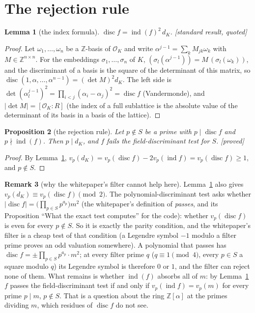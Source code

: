 \documentclass[10pt,a4paper]{article}
\newcommand{\Z}{\mathbb{Z}}
\newcommand{\OK}{\mathcal{O}_K}
\DeclareMathOperator{\disc}{disc}
\DeclareMathOperator{\ind}{ind}
\newcommand{\stproved}{\textsf{\small[proved]}\xspace}
\newcommand{\stquoted}{\textsf{\small[standard result, quoted]}\xspace}
\theoremstyle{plain}
\newtheorem{proposition}{Proposition}
\newtheorem{lemma}[proposition]{Lemma}
\theoremstyle{definition}
\newtheorem{remark}[proposition]{Remark}
\begin{document}
\section{The rejection rule}\label{sec:rule}

\begin{lemma}[the index formula]\label{lem:index}
$\disc f=\ind(f)^2\,d_K$.  \stquoted\ \cite[Ch.~I, Prop.~2.12]{Neu}
\end{lemma}

\begin{proof}
Let $\omega_1,\dots,\omega_n$ be a $\Z$-basis of $\OK$ and write $\alpha^{j-1}=\sum_k M_{jk}\omega_k$ with $M\in\Z^{n\times n}$.  For
the embeddings $\sigma_1,\dots,\sigma_n$ of $K$, $(\sigma_l(\alpha^{j-1}))=M\,(\sigma_l(\omega_k))$, and the discriminant of a basis
is the square of the determinant of this matrix, so $\disc(1,\alpha,\dots,\alpha^{n-1})=(\det M)^2d_K$.  The left side is
$\det(\alpha_l^{j-1})^2=\prod_{i<j}(\alpha_i-\alpha_j)^2=\disc f$ (Vandermonde), and $|\det M|=[\OK:R]$ (the index of a full
sublattice is the absolute value of the determinant of its basis in a basis of the lattice).
\end{proof}

\begin{proposition}[the rejection rule]\label{prop:rule}
Let $p\notin S$ be a prime with $p\mid\disc f$ and $p\nmid\ind(f)$.  Then $p\mid d_K$, and $f$ fails the field-discriminant test for $S$.
\stproved
\end{proposition}

\begin{proof}
By Lemma~\ref{lem:index}, $v_p(d_K)=v_p(\disc f)-2v_p(\ind f)=v_p(\disc f)\geq1$, and $p\notin S$.
\end{proof}

\begin{remark}[why the whitepaper's filter cannot help here]\label{rem:parity}
Lemma~\ref{lem:index} also gives $v_p(d_K)\equiv v_p(\disc f)\pmod 2$.  The polynomial-discriminant test asks whether
$|\disc f|=\bigl(\prod_{p\in S}p^{a_p}\bigr)m^2$ (the whitepaper's definition of \emph{passes}, and its Proposition ``What the exact
test computes'' for the code): whether $v_p(\disc f)$ is even for every $p\notin S$.  So it is exactly the parity condition, and the
whitepaper's filter is a cheap test of that condition (a Legendre symbol $-1$ modulo a filter prime proves an odd
valuation somewhere).  A polynomial that passes has $\disc f=\pm\prod_{p\in S}p^{a_p}\cdot m^2$; at every filter prime $q$ ($q\equiv1\pmod4$, every
$p\in S$ a square modulo $q$) its Legendre symbol is therefore $0$ or $1$, and the filter can reject none of them.  What remains is whether $\ind(f)$ absorbs all of $m$: by Lemma~\ref{lem:index}
$f$ passes the field-discriminant test if and only if $v_p(\ind f)=v_p(m)$ for every prime $p\mid m$, $p\notin S$.  That is a
question about the ring $\Z[\alpha]$ at the primes dividing $m$, which residues of $\disc f$ do not see.
\end{remark}
\end{document}
